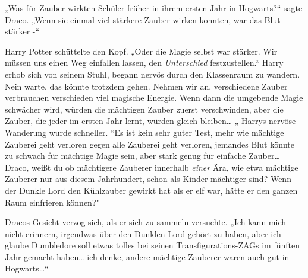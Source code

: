 „Was für Zauber wirkten Schüler früher in ihrem ersten Jahr in Hogwarts?“ sagte Draco. „Wenn sie einmal viel stärkere Zauber wirken konnten, war das Blut stärker -“

Harry Potter schüttelte den Kopf. „Oder die Magie selbst war stärker. Wir müssen uns einen Weg einfallen lassen, den \emph{Unterschied} festzustellen.“ Harry erhob sich von seinem Stuhl, begann nervös durch den Klassenraum zu wandern. Nein warte, das könnte trotzdem gehen. Nehmen wir an, verschiedene Zauber verbrauchen verschieden viel magische Energie. Wenn dann die umgebende Magie schwächer wird, würden die mächtigen Zauber zuerst verschwinden, aber die Zauber, die jeder im ersten Jahr lernt, würden gleich bleiben… „ Harrys nervöse Wanderung wurde schneller. “Es ist kein sehr guter Test, mehr wie mächtige Zauberei geht verloren gegen alle Zauberei geht verloren, jemandes Blut könnte zu schwach für mächtige Magie sein, aber stark genug für einfache Zauber… Draco, weißt du ob mächtigere Zauberer innerhalb \emph{einer} Ära, wie etwa mächtige Zauberer nur aus diesem Jahrhundert, schon als Kinder mächtiger sind? Wenn der Dunkle Lord den Kühlzauber gewirkt hat als er elf war, hätte er den ganzen Raum einfrieren können?"

Dracos Gesicht verzog sich, als er sich zu sammeln versuchte. „Ich kann mich nicht erinnern, irgendwas über den Dunklen Lord gehört zu haben, aber ich glaube Dumbledore soll etwas tolles bei seinen Transfigurations-ZAGs im fünften Jahr gemacht haben… ich denke, andere mächtige Zauberer waren auch gut in Hogwarts…“

